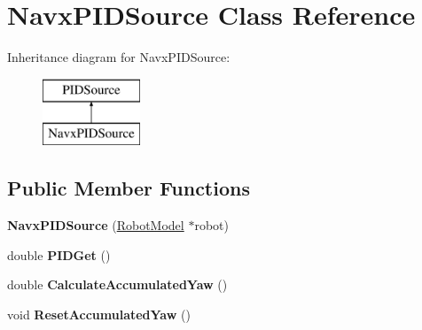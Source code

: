 \hypertarget{class_navx_p_i_d_source}{}\section{Navx\+P\+I\+D\+Source Class Reference}
\label{class_navx_p_i_d_source}
Inheritance diagram for Navx\+P\+I\+D\+Source\+:\begin{figure}[H]
\begin{center}
\leavevmode
\includegraphics[height=2.000000cm]{class_navx_p_i_d_source}
\end{center}
\end{figure}
\subsection*{Public Member Functions}
\begin{DoxyCompactItemize}
\item 
\mbox{\label{class_navx_p_i_d_source_a6d8910e49ac582970632e8ad20e9bc4b}} 
{\bfseries Navx\+P\+I\+D\+Source} (\hyperlink{class_robot_model}{Robot\+Model} $\ast$robot)
\item 
\mbox{\label{class_navx_p_i_d_source_af3d4863c8b9338340739bf0d85371827}} 
double {\bfseries P\+I\+D\+Get} ()
\item 
\mbox{\label{class_navx_p_i_d_source_ac9a334ad2d3d561f4b7e0d4686a1e3c3}} 
double {\bfseries Calculate\+Accumulated\+Yaw} ()
\item 
\mbox{\label{class_navx_p_i_d_source_a553daca7b260429b4808791ff11ada54}} 
void {\bfseries Reset\+Accumulated\+Yaw} ()
\end{DoxyCompactItemize}
